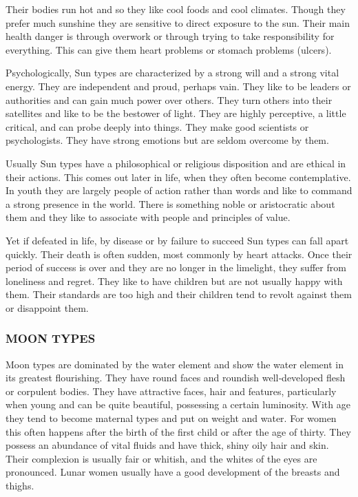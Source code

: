  

Their bodies run hot and so they like cool foods and cool climates. Though they prefer much sunshine they are sensitive to direct exposure to the sun. Their main health danger is through overwork or through trying to take responsibility for everything. This can give them heart problems or stomach problems (ulcers).

 

Psychologically, Sun types are characterized by a strong will and a strong vital energy. They are independent and proud, perhaps vain. They like to be leaders or authorities and can gain much power over others. They turn others into their satellites and like to be the bestower of light. They are highly perceptive, a little critical, and can probe deeply into things. They make good scientists or psychologists. They have strong emotions but are seldom overcome by them.

 

Usually Sun types have a philosophical or religious disposition and are ethical in their actions. This comes out later in life, when they often become contemplative. In youth they are largely people of action rather than words and like to command a strong presence in the world. There is something noble or aristocratic about them and they like to associate with people and principles of value.

 

Yet if defeated in life, by disease or by failure to succeed Sun types can fall apart quickly. Their death is often sudden, most commonly by heart attacks. Once their period of success is over and they are no longer in the limelight, they suffer from loneliness and regret. They like to have children but are not usually happy with them. Their standards are too high and their children tend to revolt against them or disappoint them.

 



\subsubsection{MOON TYPES }
 

Moon types are dominated by the water element and show the water element in its greatest flourishing. They have round faces and roundish well‑developed flesh or corpulent bodies. They have attractive faces, hair and features, particularly when young and can be quite beautiful, possessing a certain luminosity. With age they tend to become maternal types and put on weight and water. For women this often happens after the birth of the first child or after the age of thirty. They possess an abundance of vital fluids and have thick, shiny oily hair and skin. Their complexion is usually fair or whitish, and the whites of the eyes are pronounced. Lunar women usually have a good development of the breasts and thighs.

